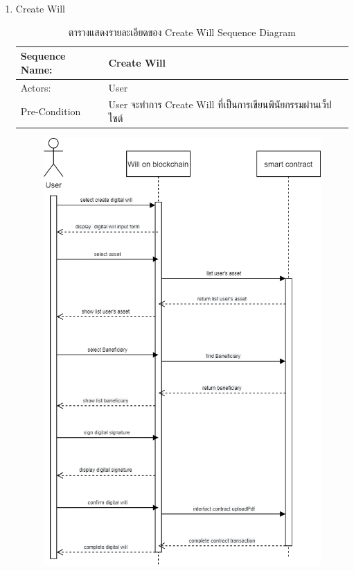 \documentclass[12pt,oneside,openright,a4paper]{cpe-thai-project}
\begin{document}
\begin{enumerate}[label=\thesubsection.\arabic*,leftmargin=0pt,itemindent=1.25cm]
\clearpage
	\item Create Will
		\begin{table}[h]
		\centering
		\caption{ตารางแสดงรายละเอียดของ Create Will Sequence Diagram}
		\begin{tabularx}{\textwidth}{|l|X|X|} 
			\hline
			Sequence Name: & Create Will                                                    \\ 
			\hline
			Actors:        & User                                                           \\ 
			\hline
			Pre-Condition  & User จะทำการ Create Will ที่เป็นการเขียนพินัยกรรมผ่านเว็ปไซต์  \\
			\hline
		\end{tabularx}
		\end{table}
		\begin{figure}[!thb]
			\centering
			\includegraphics[scale=0.45]{createWillseq}

\end{figure}
\end{enumerate}
\end{document}
